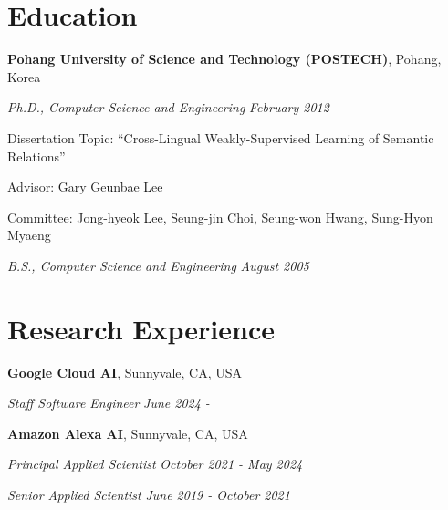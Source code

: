 \documentclass[margin,line]{res}
\newenvironment{list1}{
  \begin{list}{\ding{113}}{%
      \setlength{\itemsep}{0in}
      \setlength{\parsep}{0in} \setlength{\parskip}{0in}
      \setlength{\topsep}{0in} \setlength{\partopsep}{0in}
      \setlength{\leftmargin}{0.17in}}}{\end{list}}
\begin{document}
\begin{resume}
\section{\sc Education}
{\bf Pohang University of Science and Technology (POSTECH)}, Pohang, Korea\\
\vspace*{-.3cm}
\begin{list1}
\item[] {\em Ph.D., Computer Science and Engineering} \hfill {\em February 2012}\\
  \vspace*{-.3cm}
  \begin{list1}
  \item [] Dissertation Topic:  ``Cross-Lingual Weakly-Supervised Learning of Semantic Relations''
  \item [] Advisor:  Gary Geunbae Lee
  \item [] Committee: Jong-hyeok Lee, Seung-jin Choi, Seung-won Hwang, Sung-Hyon Myaeng
  \end{list1}
  \vspace*{.3cm}
\item[] {\em B.S., Computer Science and Engineering} \hfill {\em August 2005}\\
  \vspace*{-.3cm}
\end{list1}

\section{\sc Research Experience}
{\bf Google Cloud AI}, Sunnyvale, CA, USA\\
\vspace{-.3cm}
\begin{list1}
\item[] {\em Staff Software Engineer} \hfill {\em June 2024 -}\\
  \vspace{-.3cm}  
\end{list1}

{\bf Amazon Alexa AI}, Sunnyvale, CA, USA\\
\vspace{-.3cm}
\begin{list1}
\item[] {\em Principal Applied Scientist} \hfill {\em October 2021 - May 2024}\\
  \vspace{-.3cm}  
\item[] {\em Senior Applied Scientist} \hfill {\em June 2019 - October 2021}\\
  \vspace{-.3cm}
\end{list1}


\end{resume}
\end{document}
